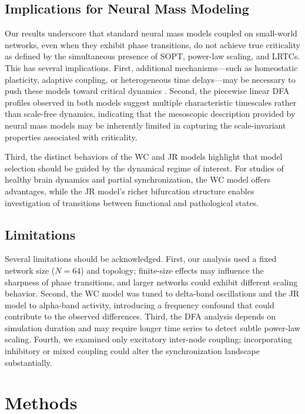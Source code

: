 \documentclass[11pt]{article}
\begin{document}
\subsection{Implications for Neural Mass Modeling}

Our results underscore that standard neural mass models coupled on small-world networks, even when they exhibit phase transitions, do not achieve true criticality as defined by the simultaneous presence of SOPT, power-law scaling, and LRTCs. This has several implications. First, additional mechanisms---such as homeostatic plasticity, adaptive coupling, or heterogeneous time delays---may be necessary to push these models toward critical dynamics \citep{breakspear2017dynamic}. Second, the piecewise linear DFA profiles observed in both models suggest multiple characteristic timescales rather than scale-free dynamics, indicating that the mesoscopic description provided by neural mass models may be inherently limited in capturing the scale-invariant properties associated with criticality.

Third, the distinct behaviors of the WC and JR models highlight that model selection should be guided by the dynamical regime of interest. For studies of healthy brain dynamics and partial synchronization, the WC model offers advantages, while the JR model's richer bifurcation structure enables investigation of transitions between functional and pathological states.

\subsection{Limitations}

Several limitations should be acknowledged. First, our analysis used a fixed network size ($N = 64$) and topology; finite-size effects may influence the sharpness of phase transitions, and larger networks could exhibit different scaling behavior. Second, the WC model was tuned to delta-band oscillations and the JR model to alpha-band activity, introducing a frequency confound that could contribute to the observed differences. Third, the DFA analysis depends on simulation duration and may require longer time series to detect subtle power-law scaling. Fourth, we examined only excitatory inter-node coupling; incorporating inhibitory or mixed coupling could alter the synchronization landscape substantially.

\section{Methods}
\end{document}
